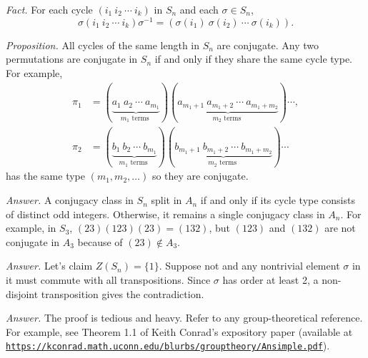 \documentclass{mathproblems}
\begin{document}
\begin{questions}

{\color{violet}
\textit{Fact.} For each cycle $(i_{1} \ i_{2} \ \cdots \ i_{k})$ in $S_{n}$ and each $\sigma \in S_{n}$,
$$
\sigma(i_{1} \ i_{2} \ \cdots \ i_{k}) \sigma^{-1}=(\sigma(i_{1}) \ \sigma(i_{2}) \ \cdots \ \sigma(i_{k})).
$$

\textit{Proposition.} All cycles of the same length in $S_n$ are conjugate. Any two permutations are conjugate in $S_n$ if and only if they share the same cycle type. For example,
$$
\begin{aligned}
\pi_{1}&=(\underbrace{a_{1}\ a_{2}\ \cdots \ a_{m_{1}}}_{m_{1} \text { terms }})(\underbrace{a_{m_{1}+1}\ a_{m_{1}+2}\ \cdots \ a_{m_{1}+m_{2}}}_{m_{2} \text { terms }}) \cdots,\\
\pi_{2}&=(\underbrace{b_{1}\ b_{2}\ \cdots\ b_{m_{1}}}_{m_{1} \text { terms }})(\underbrace{b_{m_{1}+1}\ b_{m_{1}+2}\ \cdots\ b_{m_{1}+m_{2}}}_{m_{2} \text { terms }}) \cdots
\end{aligned}
$$
has the same type $(m_1,m_2,\ldots)$ so they are conjugate.
}


\textit{Answer.} A conjugacy class in $S_n$ split in $A_n$ if and only if its cycle type consists of distinct odd integers. Otherwise, it remains a single conjugacy class in $A_n$. For example, in $S_3$, $(23)(123)(23)=(132)$, but $(123)$ and $(132)$ are not conjugate in $A_3$ because of $(23)\notin A_3$.


\textit{Answer.} Let's claim $Z(S_n)=\{1\}$. Suppose not and any nontrivial element $\sigma$ in it must commute with all transpositions. Since $\sigma$ has order at least 2, a non-disjoint transposition gives the contradiction.


\textit{Answer.} The proof is tedious and heavy. Refer to any group-theoretical reference. For example, see Theorem 1.1 of Keith Conrad's expository paper (available at \href{https://kconrad.math.uconn.edu/blurbs/grouptheory/Ansimple.pdf}{\color{blue}\texttt{https://kconrad.math.uconn.edu/blurbs/grouptheory/Ansimple.pdf}}).




\end{questions}
\end{document}
